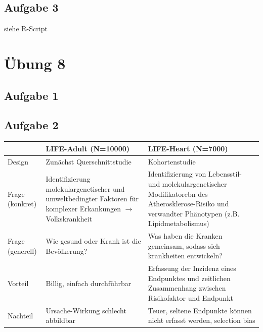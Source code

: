 \documentclass[13pt,a4paper]{article}
\begin{document}
\subsection{Aufgabe 3}
siehe R-Script

\newpage
\section{Übung 8}
\subsection{Aufgabe 1}

\subsection{Aufgabe 2}
\begin{tabularx}{\textwidth}{|p{}|p{}|p{}|}
\hline
& LIFE-Adult (N=10000) & LIFE-Heart (N=7000) \\
\hline
Design & Zunächst Querschnittstudie & Kohortenstudie \\
\hline
Frage (konkret) & Identifizierung molekulargenetischer und umweltbedingter Faktoren für komplexer Erkankungen $\rightarrow$ Volkskrankheit & Identifizierung von Lebensstil- und molekulargenetischer Modifikatorebn des Atherosklerose-Risiko und verwandter Phänotypen (z.B. Lipidmetabolismus) \\
\hline
Frage (generell) & Wie gesund oder Krank ist die Bevölkerung? & Was haben die Kranken gemeinsam, sodass sich krankheiten entwickeln? \\
\hline
Vorteil & Billig, einfach durchführbar & Erfassung der Inzidenz eines Endpunktes und zeitlichen Zusammenhang zwischen Risikofaktor und Endpunkt \\
\hline
Nachteil & Ursache-Wirkung schlecht abbildbar & Teuer, seltene Endpunkte können nicht erfasst werden, selection bias\\
\hline
\end{tabularx}
\end{document}
